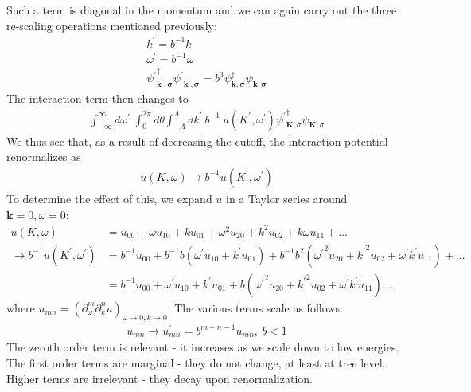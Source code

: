 \documentclass{article}
\begin{document}
Such a term is diagonal in the momentum and we can again carry out the three re-scaling operations mentioned previously:
\begin{gather}
	k^\prime = b^{-1} k\\
	\omega^\prime = b^{-1} \omega\\
{\psi^\prime}^\dagger_\mathbf{k^\prime,\sigma}{\psi^\prime}_\mathbf{k^\prime,\sigma} = b^{3}\psi^\dagger_\mathbf{k,\sigma}\psi_\mathbf{k,\sigma}
\end{gather}
The interaction term then changes to
\begin{equation}\begin{aligned}
	\int_{-\infty}^\infty d\omega^\prime\;\int_0^{2\pi} d\theta \int_{-\Lambda}^{\Lambda}dk^\prime ~ b^{-1} ~ u(K^\prime,\omega^\prime){\psi^\prime}_{\mathbf{K},\sigma}^\dagger\psi_{\mathbf{K},\sigma}
\end{aligned}\end{equation}
We thus see that, as a result of decreasing the cutoff, the interaction potential renormalizes as
\begin{equation}\begin{aligned}
	u(K,\omega) \to b^{-1} u(K^\prime,\omega^\prime)
\end{aligned}\end{equation}
To determine the effect of this, we expand \(u\) in a Taylor series around \(\mathbf{k}=0,\omega=0\):
\begin{equation}\begin{aligned}
	u(K,\omega) &= u_{00} + \omega u_{10} + k u_{01} + \omega^2 u_{20} + k^2 u_{02} + k\omega u_{11} + ...\\
	\to b^{-1}u(K^\prime,\omega^\prime) &= b^{-1}u_{00} + b^{-1} b\left(\omega^\prime u_{10} + k^\prime u_{01}\right) + b^{-1} b^{2} \left({\omega^\prime}^2 u_{20} + {k^\prime}^2 u_{02} + \omega^\prime k^\prime u_{11}\right) + ...\\
						   &= b^{-1}u_{00} + \omega^\prime u_{10} + k^\prime u_{01} + b \left({\omega^\prime}^2 u_{20} + {k^\prime}^2 u_{02} + \omega^\prime k^\prime u_{11}\right)...
\end{aligned}\end{equation}
where \(u_{mn} = \left(\partial^m_\omega \partial^n_k u\right)_{\omega \to 0, k \to 0}\). The various terms scale as follows:
\begin{equation}\begin{aligned}
	u_{mn} \to u_{mn}^\prime = b^{m + n - 1}u_{mn}, ~b<1
\end{aligned}\end{equation}
The zeroth order term is relevant - it increases as we scale down to low energies. The first order terms are marginal - they do not change, at least at tree level. Higher terms are irrelevant - they decay upon renormalization.
\end{document}
